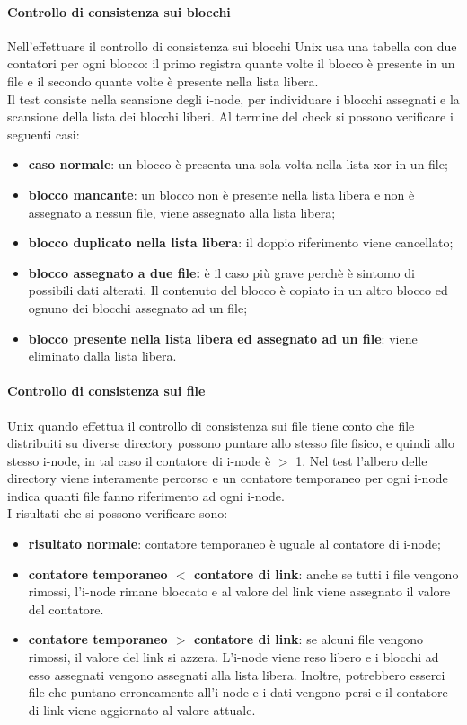 \documentclass[12pt, letterpaper]{report}
\begin{document}
	 \paragraph{Controllo di consistenza sui blocchi} Nell'effettuare il controllo di consistenza sui blocchi Unix usa una tabella con due contatori per ogni blocco: il primo registra quante volte il blocco è presente in un file e il secondo quante volte è presente nella lista libera. \\
	 Il test consiste nella scansione degli i-node, per individuare i blocchi assegnati e la scansione della lista dei blocchi liberi. Al termine del check si possono verificare i seguenti casi:
	 \begin{itemize}
	 	\item \textbf{caso normale}: un blocco è presenta una sola volta nella lista xor in un file;
	 	\item \textbf{blocco mancante}: un blocco non è presente nella lista libera e non è assegnato a nessun file, viene assegnato alla lista libera;
	 	\item \textbf{blocco duplicato nella lista libera}: il doppio riferimento viene cancellato;
	 	\item \textbf{blocco assegnato a due file:} è il caso più grave perchè è sintomo di possibili dati alterati. Il contenuto del blocco è copiato in un altro blocco ed ognuno dei blocchi assegnato ad un file;
	 	\item \textbf{blocco presente nella lista libera ed assegnato ad un file}: viene eliminato dalla lista libera.
	 \end{itemize}
	 \paragraph{Controllo di consistenza sui file} Unix quando effettua il controllo di consistenza sui file tiene conto che file distribuiti su diverse directory possono puntare allo stesso file fisico, e quindi allo stesso i-node, in tal caso il contatore di i-node è $>$ 1. Nel test l'albero delle directory viene interamente percorso e un contatore temporaneo per ogni i-node indica quanti file fanno riferimento ad ogni i-node. \\
	 I risultati che si possono verificare sono:
	 \begin{itemize}
	 	\item \textbf{risultato normale}: contatore temporaneo è uguale al contatore di i-node;
	 	\item \textbf{contatore temporaneo $<$ contatore di link}: anche se tutti i file vengono rimossi, l'i-node rimane bloccato e al valore del link viene assegnato il valore del contatore.
	 	\item \textbf{contatore temporaneo $>$ contatore di link}: se alcuni file vengono rimossi, il valore del link si azzera. L'i-node viene reso libero e i blocchi ad esso assegnati vengono assegnati alla lista libera. Inoltre, potrebbero esserci file che puntano erroneamente all'i-node e i dati vengono persi e il contatore di link viene aggiornato al valore attuale.
	 \end{itemize}
\end{document}
